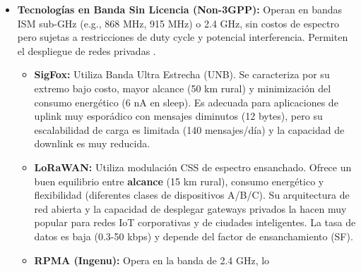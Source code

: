 \begin{itemize}
      \item \textbf{Tecnologías en Banda Sin Licencia (Non-3GPP):} Operan en
            bandas ISM sub-GHz (e.g., 868 MHz, 915 MHz) o 2.4 GHz, sin costos de
            espectro pero sujetas a restricciones  de  duty  cycle  y  potencial
            interferencia.   Permiten   el   despliegue   de   redes    privadas
            \parencite[]{chilamkurthy2022low}. \begin{itemize}
                  \item \textbf{SigFox:} Utiliza Banda Ultra Estrecha (UNB). Se
                        caracteriza por su extremo bajo costo, mayor alcance (50
                        km rural) y minimización del consumo energético (6 nA en
                        sleep). Es adecuada  para  aplicaciones  de  uplink  muy
                        esporádico con mensajes diminutos (12  bytes),  pero  su
                        escalabilidad de carga es limitada (140 mensajes/día)  y
                        la capacidad de downlink es muy reducida.
                  \item \textbf{LoRaWAN:} Utiliza modulación CSS de espectro
                        ensanchado.   Ofrece   un    buen    equilibrio    entre
                        \textbf{alcance} (15 km  rural),  consumo  energético  y
                        flexibilidad (diferentes clases de dispositivos  A/B/C).
                        Su  arquitectura  de  red  abierta  y  la  capacidad  de
                        desplegar gateways privados la hacen  muy  popular  para
                        redes IoT corporativas y de  ciudades  inteligentes.  La
                        tasa de datos es baja (0.3-50 kbps) y depende del factor
                        de ensanchamiento (SF).
                  \item \textbf{RPMA (Ingenu):} Opera en la banda de 2.4 GHz, lo










\end{itemize}
\end{itemize}
